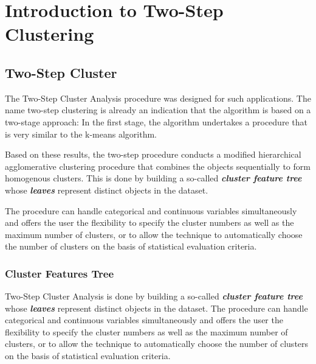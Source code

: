 \documentclass[a4paper,12pt]{report}
\begin{document}
	
	
	
	
	\tableofcontents
	\newpage
	
	\chapter{Introduction to Two-Step Clustering}

\section{Two-Step Cluster}

The Two-Step Cluster Analysis procedure was designed for such applications. The name two-step clustering is already an indication that the algorithm is based on a two-stage approach: In the first stage, the algorithm undertakes a procedure that is very similar to the k-means algorithm. 

Based on these results, the two-step
procedure conducts a modified hierarchical agglomerative clustering procedure that
combines the objects sequentially to form homogenous clusters. This is done by
building a so-called \textbf{\textit{cluster feature tree}} whose \textbf{\textit{leaves}} represent distinct objects in the dataset. 

The procedure can handle categorical and continuous variables simultaneously
and offers the user the flexibility to specify the cluster numbers as well as
the maximum number of clusters, or to allow the technique to automatically choose
the number of clusters on the basis of statistical evaluation criteria.

\subsection{Cluster Features Tree}

Two-Step Cluster Analysis is done by building a so-called \textbf{\textit{cluster feature tree}} whose \textbf{\textit{leaves}} represent distinct objects in the dataset. The procedure can handle categorical and continuous variables simultaneously and offers the user the flexibility to specify the cluster numbers as well as the maximum number of clusters, or to allow the technique to automatically choose the number of clusters on the basis of statistical evaluation criteria.
\end{document}
